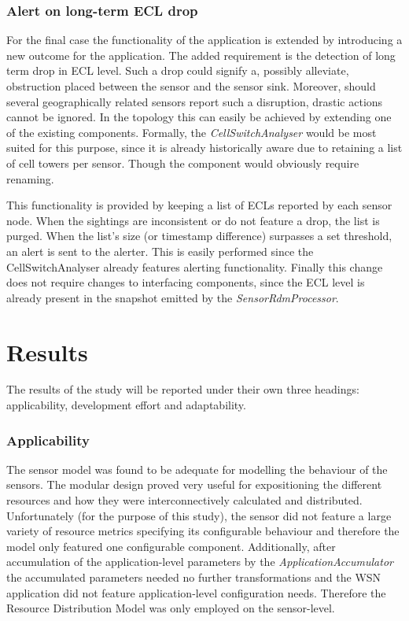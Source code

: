 \subsubsection{Alert on long-term ECL drop}
For the final case the functionality of the application is extended by introducing a new outcome for the application. The added requirement is the detection of long term drop in ECL level. Such a drop could signify a, possibly alleviate, obstruction placed between the sensor and the sensor sink. Moreover, should several geographically related sensors report such a disruption, drastic actions cannot be ignored. In the topology this can easily be achieved by extending one of the existing components. Formally, the \emph{CellSwitchAnalyser} would be most suited for this purpose, since it is already historically aware due to retaining a list of cell towers per sensor. Though the component would obviously require renaming.

This functionality is provided by keeping a list of ECLs reported by each sensor node. When the sightings are inconsistent or do not feature a drop, the list is purged. When the list's size (or timestamp difference) surpasses a set threshold, an alert is sent to the alerter. This is easily performed since the CellSwitchAnalyser already features alerting functionality. Finally this change does not require changes to interfacing components, since the ECL level is already present in the snapshot emitted by the \emph{SensorRdmProcessor}.

\section{Results}
The results of the study will be reported under their own three headings: applicability, development effort and adaptability.

\subsubsection{Applicability}
The sensor model was found to be adequate for modelling the behaviour of the \sensit sensors. The modular design proved very useful for expositioning the different resources and how they were interconnectively calculated and distributed. Unfortunately (for the purpose of this study), the sensor did not feature a large variety of resource metrics specifying its configurable behaviour and therefore the model only featured one configurable component. Additionally, after accumulation of the application-level parameters by the \emph{ApplicationAccumulator} the accumulated parameters needed no further transformations and the WSN application did not feature application-level configuration needs. Therefore the Resource Distribution Model was only employed on the sensor-level.

